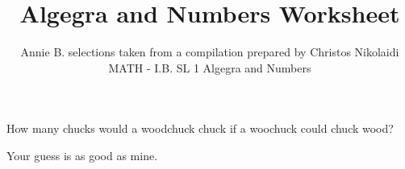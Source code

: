 \documentclass[12pt]{article}
\newenvironment{question}[2][Question]{\begin{trivlist}
\item[\hskip \labelsep {\bfseries #1}\hskip \labelsep {\bfseries #2.}]}{\end{trivlist}}
\newenvironment{answer}[2][Answer]{\begin{trivlist}
\item[\hskip \labelsep {\bfseries #1}\hskip \labelsep {\bfseries #2.}]}{\end{trivlist}}
\begin{document}
 
 
 
\title{Algegra and Numbers Worksheet}
\author{Annie B. selections taken from a compilation prepared by Christos Nikolaidi\\ 
MATH - I.B. SL 1 Algegra and Numbers}
\maketitle

\begin{question}{1}
  How many chucks would a woodchuck chuck if a woochuck could chuck wood?
\end{question}

\begin{answer}{1}
Your guess is as good as mine.
\end{answer}
 
 
\end{document}
